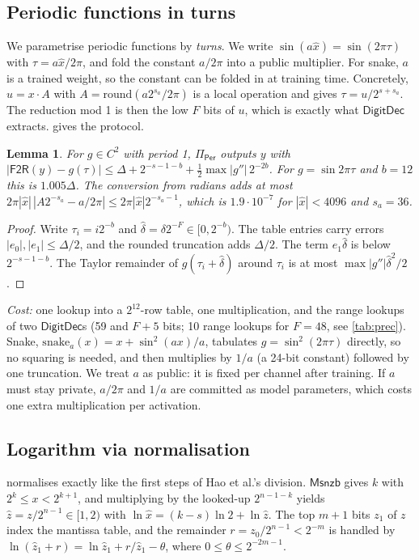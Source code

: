 \documentclass[10pt,twocolumn]{article}
\newtheorem{lemma}{Lemma}
\theoremstyle{remark}
\newcommand{\FtoR}{\mathsf{F2R}}
\newcommand{\DD}{\mathsf{DigitDec}}
\newcommand{\Msnzb}{\mathsf{Msnzb}}
\newcommand{\ulp}{\Delta}
\begin{document}


\subsection{Periodic functions in turns}
We parametrise periodic functions by \emph{turns}. We write $\sin(a\hat x)=\sin(2\pi\tau)$ with
$\tau=a\hat x/2\pi$, and fold the constant $a/2\pi$ into a public multiplier. For snake, $a$ is a
trained weight, so the constant can be folded in at training time. Concretely,
$u=x\cdot A$ with $A=\mathrm{round}(a2^{s_a}/2\pi)$ is a local operation and gives
$\tau=u/2^{s+s_a}$. The reduction mod 1 is then the low $F$ bits of $u$, which is exactly what $\DD$
extracts.  gives the protocol.

\begin{lemma}\label{lem:per}
For $g\in C^2$ with period 1, $\Pi_{\mathsf{Per}}$ outputs $y$ with
$|\FtoR(y)-g(\tau)|\le\ulp+2^{-s-1-b}+\tfrac12\max|g''|\,2^{-2b}$.
For $g=\sin2\pi\tau$ and $b=12$ this is $1.005\ulp$. The conversion from radians adds at most
$2\pi|\hat x|\,|A2^{-s_a}-a/2\pi|\le2\pi|\hat x|2^{-s_a-1}$, which is $1.9\cdot10^{-7}$ for
$|\hat x|<4096$ and $s_a=36$.
\end{lemma}
\begin{proof}
Write $\tau_i=i2^{-b}$ and $\hat\delta=\delta2^{-F}\in[0,2^{-b})$. The table entries carry errors
$|e_0|,|e_1|\le\ulp/2$, and the rounded truncation adds $\ulp/2$. The term $e_1\hat\delta$ is
below $2^{-s-1-b}$. The Taylor remainder of $g(\tau_i+\hat\delta)$ around $\tau_i$ is at most
$\max|g''|\hat\delta^2/2$.
\end{proof}
\noindent\emph{Cost:} one lookup into a $2^{12}$-row table, one multiplication, and the range
lookups of two $\DD$s (59 and $F+5$ bits; 10 range lookups for $F=48$, see \cref{tab:prec}).
Snake, $\mathrm{snake}_a(x)=x+\sin^2(ax)/a$, tabulates $g=\sin^2(2\pi\tau)$ directly, so no
squaring is needed, and then multiplies by $1/a$ (a 24-bit constant) followed by one truncation.
We treat $a$ as public: it is fixed per channel after training. If $a$ must stay private, $a/2\pi$
and $1/a$ are committed as model parameters, which costs one extra multiplication per activation.

\subsection{Logarithm via normalisation}
 normalises exactly like the first steps of Hao et al.'s division. $\Msnzb$ gives $k$
with $2^k\le x<2^{k+1}$, and multiplying by the looked-up $2^{n-1-k}$ yields
$\hat z=z/2^{n-1}\in[1,2)$ with $\ln\hat x=(k-s)\ln2+\ln\hat z$. The top $m+1$ bits $z_1$ of $z$
index the mantissa table, and the remainder $r=z_0/2^{n-1}<2^{-m}$ is handled by
$\ln(\hat z_1+r)=\ln\hat z_1+r/\hat z_1-\theta$, where $0\le\theta\le2^{-2m-1}$.
\end{document}
